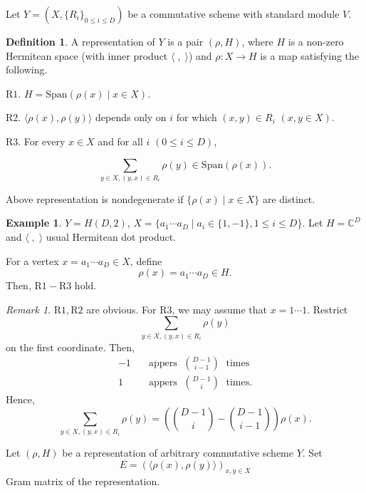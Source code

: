 \documentclass[
]{book}
\theoremstyle{definition}
\newtheorem{definition}{Definition}[chapter]
\theoremstyle{definition}
\newtheorem{example}{Example}[chapter]
\theoremstyle{definition}
\theoremstyle{definition}
\theoremstyle{remark}
\newtheorem*{remark}{Remark}
\begin{document}
Let \(Y = (X, \{R_i\}_{0\leq i\leq D})\) be a commutative scheme with standard module \(V\).

\begin{definition}
\protect\hypertarget{def:representation-of-y}{}\label{def:representation-of-y}A representation of \(Y\) is a pair \((\rho, H)\), where \(H\) is a non-zero Hermitean space (with inner product \(\langle \;, \;\rangle\)) and
\(\rho: X\to H\) is a map satisfying the following.

\(\mathrm{R1}\). \(H = \mathrm{Span}(\rho(x)\mid x\in X)\).

\(\mathrm{R2}\). \(\langle \rho(x), \rho(y)\rangle\) depends only on \(i\) for which \((x,y)\in R_i\) \((x,y\in X)\).

\(\mathrm{R3}\). For every \(x\in X\) and for all \(i\) \((0\leq i\leq D)\),

\[\sum_{y\in X, (y,x)\in R_i}\rho(y)\in \mathrm{Span}(\rho(x)).\]

Above representation is nondegenerate if \(\{\rho(x)\mid x\in X\}\) are distinct.
\end{definition}

\begin{example}
\protect\hypertarget{exm:representation-of-hd2}{}\label{exm:representation-of-hd2}\(Y = H(D,2)\), \(X = \{a_1\cdots a_D\mid a_i\in \{1,-1\}, 1\leq i\leq D\}\).
Let \(H = \mathbb{C}^D\) and \(\langle \;, \;\rangle\) usual Hermitean dot product.

For a vertex \(x = a_1\cdots a_D\in X\), define
\[\rho(x) = a_1\cdots a_D\in H.\]
Then, \(\mathrm{R1}-\mathrm{R3}\) hold.
\end{example}

\begin{remark}
\(\mathrm{R1}, \mathrm{R2}\) are obvious.
For \(\mathrm{R3}\), we may assume that \(x = 1\cdots 1\).
Restrict
\[\sum_{y\in X, (y,x)\in R_i}\rho(y)\]
on the first coordinate. Then,
\begin{align}
-1 & \quad \text{appers }\; \binom{D-1}{i-1} \;\text{ times}\\
1 & \quad \text{appers } \;\binom{D-1}{i} \;\text{ times}.
\end{align}
Hence,
\[\sum_{y\in X, (y,x)\in R_i}\rho(y) = \left(\binom{D-1}{i} - \binom{D-1}{i-1}\right)\rho(x).\]
\end{remark}

Let \((\rho, H)\) be a representation of arbitrary commutative scheme \(Y\). Set
\[E = (\langle \rho(x),\rho(y)\rangle)_{x,y\in X}\]
Gram matrix of the representation.
\end{document}

